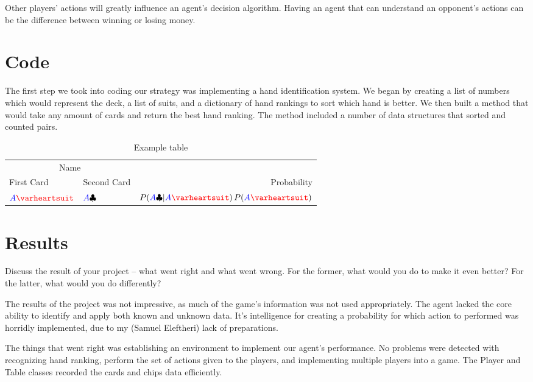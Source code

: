 \documentclass[10pt, a4paper, twocolumn]{article} %
\newcommand*\Hs[1]{\ensuremath{{\color{blue} #1}{\color{red}\varheartsuit}}}
\newcommand*\Cs[1]{\ensuremath{{\color{blue} #1}{\color{black}\clubsuit}}}
\begin{document}
Other players' actions will greatly influence an agent's decision algorithm. Having an agent that can understand an opponent's actions can be the difference between winning or losing money.  

\section{Code}

The first step we took into coding our strategy was implementing a hand identification system. We began by creating a list of numbers which would represent the deck, a list of suits, and a dictionary of hand rankings to sort which hand is better. We then built a method that would take any amount of cards and return the best hand ranking. The method included a number of data structures that sorted and counted pairs.
\begin{table}
	\caption{Example table}
	\centering
	\begin{tabular}{llr}
		\toprule
		\multicolumn{2}{c}{Name} \\
		\cmidrule(r){1-2}
		First Card & Second Card  & Probability \\
		\midrule
		\Hs{A} & \Cs{A} & $P(\Cs{A}|\Hs{A})\,P(\Hs{A})$ \\
		\bottomrule
	\end{tabular}
\end{table}


\section{Results}
Discuss the result of your project -- what went right and what went wrong.  For the former, what would you do to make it even better? For the latter, what would you do differently?

The results of the project was not impressive, as much of the game's information was not used appropriately. The agent lacked the core ability to identify and apply both known and unknown data. It's intelligence for creating a probability for which action to performed was horridly implemented, due to my (Samuel Eleftheri) lack of preparations. 

The things that went right was establishing an environment to implement our agent's performance. No problems were detected with recognizing hand ranking, perform the set of actions given to the players, and implementing multiple players into a game. The Player and Table classes recorded the cards and chips data efficiently.


\printbibliography[title={Bibliography}] %


\end{document}
